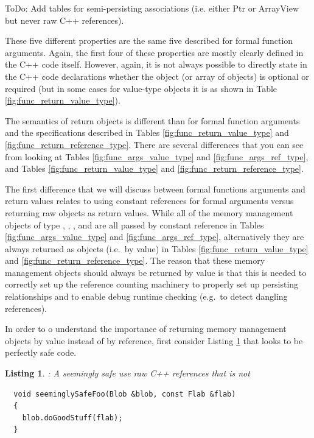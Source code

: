 \documentclass[pdf,ps2pdf,11pt]{SANDreport}
\newtheorem{listing}{Listing}
\begin{document}
ToDo: Add tables for semi-persisting associations (i.e. either Ptr or
ArrayView but never raw C++ references).


These five different properties are the same five described for formal
function arguments.  Again, the first four of these properties are
mostly clearly defined in the C++ code itself.  However, again, it is
not always possible to directly state in the C++ code declarations
whether the object (or array of objects) is optional or required (but
in some cases for value-type objects it is as shown in Table
{}\ref{fig:func_return_value_type}).

The semantics of return objects is different than for formal function
arguments and the specifications described in Tables
{}\ref{fig:func_return_value_type} and
{}\ref{fig:func_return_reference_type}.  There are several differences
that you can see from looking at Tables
{}\ref{fig:func_args_value_type} and {}\ref{fig:func_args_ref_type},
and Tables {}\ref{fig:func_return_value_type} and
{}\ref{fig:func_return_reference_type}.

The first difference that we will discuss between formal functions
arguments and return values relates to using constant references for
formal arguments versus returning raw objects as return values.  While
all of the memory management objects of type {},
{}, {}, and {} are all
passed by constant reference in Tables
{}\ref{fig:func_args_value_type} and {}\ref{fig:func_args_ref_type},
alternatively they are always returned as objects (i.e.\ by value) in
Tables {}\ref{fig:func_return_value_type} and
{}\ref{fig:func_return_reference_type}.  The reason that these memory
management objects should always be returned by value is that this is
needed to correctly set up the reference counting machinery to
properly set up persisting relationships and to enable debug runtime
checking (e.g.\ to detect dangling references).

In order to o understand the importance of returning memory management
objects by value instead of by reference, first consider Listing
{}\ref{listing:unsafe_raw_C++_reference1} that looks to be perfectly
safe code.

\begin{listing}: A seemingly safe use raw C++ references that is not \\
\label{listing:unsafe_raw_C++_reference1}
{\small\begin{verbatim}
  void seeminglySafeFoo(Blob &blob, const Flab &flab)
  {
    blob.doGoodStuff(flab);
  }
\end{verbatim}}
\end{listing}
\end{document}
